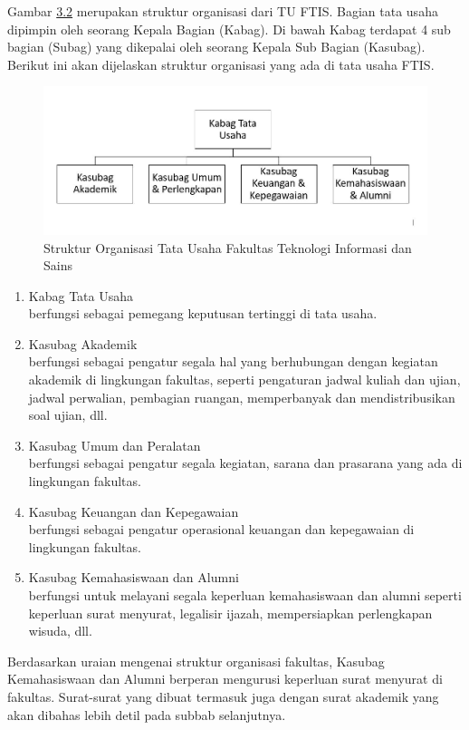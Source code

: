 Gambar \hyperlink{organigram_TU}{3.2} merupakan struktur organisasi dari TU FTIS. Bagian tata usaha dipimpin oleh seorang Kepala Bagian (Kabag). Di bawah Kabag terdapat 4 sub bagian (Subag) yang dikepalai oleh seorang Kepala Sub Bagian (Kasubag). Berikut ini akan dijelaskan struktur organisasi yang ada di tata usaha FTIS.
\begin{figure}[H]
	\centering
		\includegraphics[scale=0.35]{Gambar/Diagram/sistem_terkini/organigram/organigram_TU.JPG}
	\caption{Struktur Organisasi Tata Usaha Fakultas Teknologi Informasi dan Sains}
	\label{fig:organigram_TU}
\end{figure}
\begin{enumerate}
	\item Kabag Tata Usaha \\
	berfungsi sebagai pemegang keputusan tertinggi di tata usaha.
	\item Kasubag Akademik \\
	berfungsi sebagai pengatur segala hal yang berhubungan dengan kegiatan akademik di lingkungan fakultas, seperti pengaturan jadwal kuliah dan ujian, jadwal perwalian, pembagian ruangan, memperbanyak dan mendistribusikan soal ujian, dll.
	\item Kasubag Umum dan Peralatan \\
	berfungsi sebagai pengatur segala kegiatan, sarana dan prasarana yang ada di lingkungan fakultas. 
	\item Kasubag Keuangan dan Kepegawaian \\
	berfungsi sebagai pengatur operasional keuangan dan kepegawaian di lingkungan fakultas.
	\item Kasubag Kemahasiswaan dan Alumni \\
	berfungsi untuk melayani segala keperluan kemahasiswaan dan alumni seperti keperluan surat menyurat, legalisir ijazah, mempersiapkan perlengkapan wisuda, dll.
\end{enumerate}
Berdasarkan uraian mengenai struktur organisasi fakultas, Kasubag Kemahasiswaan dan Alumni berperan mengurusi keperluan surat menyurat di fakultas. Surat-surat yang dibuat termasuk juga dengan surat akademik yang akan dibahas lebih detil pada subbab selanjutnya.

